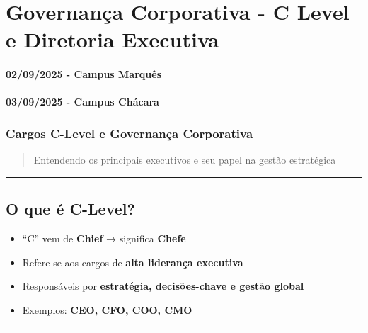 \documentclass[
]{book}
\providecommand{\tightlist}{%
  \setlength{\itemsep}{0pt}\setlength{\parskip}{0pt}}
\begin{document}
\chapter{Governança Corporativa - C Level e Diretoria Executiva}\label{governanuxe7a-corporativa---c-level-e-diretoria-executiva}

\subsubsection*{02/09/2025 - Campus Marquês}\label{campus-marquuxeas-4}

\subsubsection*{03/09/2025 - Campus Chácara}\label{campus-chuxe1cara-4}

\subsection{Cargos C-Level e Governança Corporativa}\label{cargos-c-level-e-governanuxe7a-corporativa}

\begin{quote}
Entendendo os principais executivos e seu papel na gestão estratégica
\end{quote}

\begin{center}\rule{0.5\linewidth}{0.5pt}\end{center}

\section{O que é C-Level?}\label{o-que-uxe9-c-level}

\begin{itemize}
\tightlist
\item
  ``C'' vem de \textbf{Chief} → significa \textbf{Chefe}
\item
  Refere-se aos cargos de \textbf{alta liderança executiva}
\item
  Responsáveis por \textbf{estratégia, decisões-chave e gestão global}
\item
  Exemplos: \textbf{CEO, CFO, COO, CMO}
\end{itemize}

\begin{center}\rule{0.5\linewidth}{0.5pt}\end{center}
\end{document}
